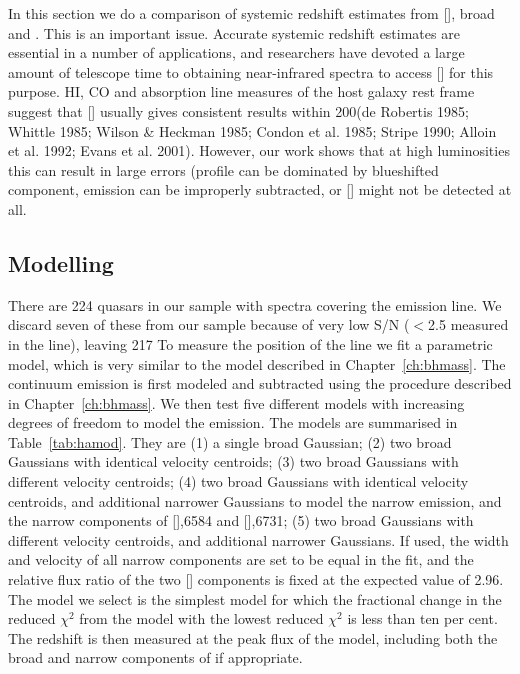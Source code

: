 In this section we do a comparison of systemic redshift estimates from [], broad \hb and \hans. 
This is an important issue. 
Accurate systemic redshift estimates are essential in a number of applications, and researchers have devoted a large amount of telescope time to obtaining near-infrared spectra to access [] for this purpose. 
HI, CO and absorption line measures of the host galaxy rest frame suggest that [] usually gives consistent results within 200\kms (de Robertis 1985; Whittle 1985; Wilson \& Heckman 1985; Condon et al. 1985; Stripe 1990; Alloin et al. 1992; Evans et al. 2001).  
However, our work shows that at high luminosities this can result in large errors (profile can be dominated by blueshifted component,  emission can be improperly subtracted, or [] might not be detected at all. 

\subsection{Modelling \hans}

There are 224 quasars in our sample with spectra covering the \ha emission line. 
We discard seven of these from our sample because of very low \ac{S/N} ($<$2.5 measured in the \ha line), leaving 217
To measure the position of the line we fit a parametric model, which is very similar to the model described in Chapter~\ref{ch:bhmass}. 
The continuum emission is first modeled and subtracted using the procedure described in Chapter~\ref{ch:bhmass}. 
We then test five different models with increasing degrees of freedom to model the \ha emission. 
The models are summarised in Table~\ref{tab:hamod}. 
They are (1) a single broad Gaussian; (2) two broad Gaussians with identical velocity centroids; (3) two broad Gaussians with different velocity centroids; (4) two broad Gaussians with identical velocity centroids, and additional narrower Gaussians to model the narrow \ha emission, and the narrow components of [],6584 and [],6731; (5) two broad Gaussians with different velocity centroids, and additional narrower Gaussians. 
If used, the width and velocity of all narrow components are set to be equal in the fit, and the relative flux ratio of the two [] components is fixed at the expected value of 2.96.
The model we select is the simplest model for which the fractional change in the reduced $\chi^2$ from the model with the lowest reduced $\chi^2$ is less than ten per cent. 
The redshift is then measured at the peak flux of the \ha model, including both the broad and narrow components of \ha if appropriate. 

